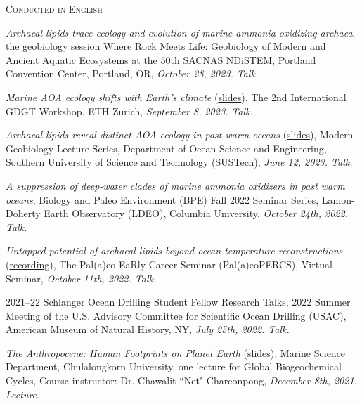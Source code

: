\documentclass[11pt, letter]{article}
\newcommand{\margintext}[1]{\marginnote{\normalsize\textbf #1 |}}
\begin{document}
\margintext{Invited Talks \& Lectures}
\textsc{Conducted in English}
\begin{etaremune}

\item \textit{Archaeal lipids trace ecology and evolution of marine ammonia-oxidizing archaea}, the geobiology session Where Rock Meets Life: Geobiology of Modern and Ancient Aquatic Ecosystems at the 50th SACNAS NDiSTEM, Portland Convention Center, Portland, OR, \textit{October 28, 2023. Talk.}

\item \textit{Marine AOA ecology shifts with Earth’s climate} (\href{https://tamucs-my.sharepoint.com/:b:/g/personal/rrattan_tamu_edu/EZQsnDcppXpAkxq9H8E_L1YBK_Jnd2zL1lPQwsRLIZZ_xw?e=ilpAa1}{slides}), The 2nd International GDGT Workshop, ETH Zurich, \textit{September 8, 2023. Talk.}

\item \textit{Archaeal lipids reveal distinct AOA ecology in past warm oceans} (\href{https://tamucs-my.sharepoint.com/:b:/g/personal/rrattan_tamu_edu/ET9FxsRS79dBv4giDLNmCKIB0X_tnPspwI18D1e8uKEFLw?e=6On32v}{slides}), Modern Geobiology Lecture Series, Department of Ocean Science and Engineering, Southern University of Science and Technology (SUSTech), \textit{June 12, 2023. Talk.}

\item \textit{A suppression of deep-water clades of marine ammonia oxidizers in past warm oceans}, Biology and Paleo Environment (BPE) Fall 2022 Seminar Series, Lamon-Doherty Earth Observatory (LDEO), Columbia University, \textit{October 24th, 2022. Talk.}

\item \textit{Untapped potential of archaeal lipids beyond ocean temperature reconstructions} (\href{https://www.youtube.com/watch?v=95o7ogv_T9I}{recording}), The Pal(a)eo EaRly Career Seminar (Pal(a)eoPERCS), Virtual Seminar, \textit{October 11th, 2022. Talk.}

\item 2021–22 Schlanger Ocean Drilling Student Fellow Research Talks, 2022 Summer Meeting of the U.S. Advisory Committee for Scientific Ocean Drilling (USAC), American Museum of Natural History, NY, \textit{July 25th, 2022. Talk.}

\item \textit{The Anthropocene: Human Footprints on Planet Earth} (\href{https://docs.google.com/presentation/d/1XTTknlXZghoFSpxdI-8KNPqmwrOvbwUQ9sDqNNvJDf0/edit?usp=sharing}{slides}), Marine Science Department, Chulalongkorn University, one lecture for Global Biogeochemical Cycles, Course instructor: Dr. Chawalit ``Net" Chareonpong, \textit{December 8th, 2021. Lecture.}
\end{etaremune}
\end{document}

